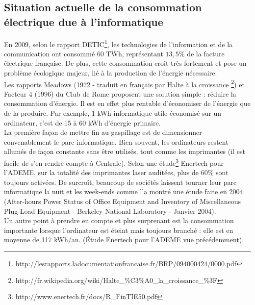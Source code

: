 \documentclass[a4paper,11pt,french]{article}
\begin{document}
\subsection{Situation actuelle de la consommation électrique due à l'informatique}
En 2009, selon le rapport DETIC\footnote{\textsf{http://lesrapports.ladocumentationfrancaise.fr/BRP/094000424/0000.pdf}}, les technologies de l’information et de la communication ont consommé 60 TWh, représentant $13,5\%$ de la facture électrique française. De plus, cette consommation croît très fortement et pose un problème écologique majeur, lié à la production de l’énergie nécessaire.\\

Les rapports Meadows (1972 - traduit en français par \og Halte à la croissance \fg \footnote{\textsf{http://fr.wikipedia.org/wiki/Halte\_{}\%C3\%A0\_{}la\_{}croissance\_{}\%3F}}) et Facteur 4 (1996) du Club de Rome proposent une solution simple : réduire la consommation d’énergie. Il est en effet plus rentable d’économiser de l’énergie que de la produire. Par exemple, 1 kWh informatique utile économisé sur un ordinateur, c’est de 15 à 60 kWh d’énergie primaire.\\

La première façon de mettre fin au gaspillage est de dimensionner convenablement le parc informatique. Bien souvent, les ordinateurs restent allumés de façon constante sans être utilisés, tout comme les imprimantes (il est facile de s’en rendre compte à Centrale). Selon une étude\footnote{\textsf{http://www.enertech.fr/docs/R\_{}FinTIE50.pdf}} Enertech pour l’ADEME, sur la totalité des imprimantes laser auditées, plus de $60\%$ sont toujours activées. De surcroît, beaucoup de sociétés laissent tourner leur parc informatique la nuit et les week-ends comme l’a montré une étude faite en 2004 (After-hours Power Status of Office Equipment and Inventory of Miscellaneous Plug-Load Equipment - Berkeley National Laboratory - Janvier 2004).\\

Un autre point à prendre en compte et plus surprenant est la consommation importante lorsque l’ordinateur est éteint mais toujours branché : elle est en moyenne de 117 kWh/an. (Étude Enertech pour l’ADEME vue précédemment).
\end{document}
